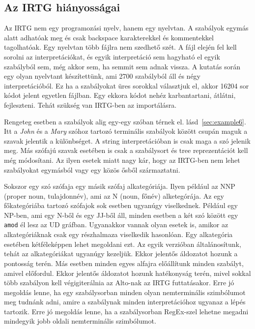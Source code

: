 \subsection{Az IRTG hiányosságai}
\label{sec:IRTGshortcomming}

Az IRTG nem egy programozási nyelv, hanem egy nyelvtan. A szabályok egymás alatt adhatóak meg és csak backspace karakterekkel és kommentekkel tagolhatóak. Egy nyelvtan több fájlra nem szedhető szét. A fájl elején fel kell sorolni az interpretációkat, és egyik interpretáció sem hagyható el egyik szabályból sem, még akkor sem, ha semmit sem adnak vissza. A kutatás során egy olyan nyelvtant készítettünk, ami 2700 szabályból áll és négy interpretációból. Ez ha a szabályokat üres sorokkal választjuk el, akkor 16204 sor kódot jelent egyetlen fájlban. Egy ekkora kódot nehéz karbantartani, átlátni, fejleszteni. Tehát szükség van IRTG-ben az importálásra.


Rengeteg esetben a szabályok alig egy-egy szóban térnek el. lásd~\ref{sec:example6}.
Itt a \textit{John} és a \textit{Mary} szóhoz tartozó terminális szabályok között csupán maguk a szavak jelentik a különbséget. A string interpretációban is csak maga a szó jelenik meg. Más szófajú szavak esetében is csak a szabálysort és tree reprezentációt kell még módosítani. Az ilyen esetek miatt nagy kár, hogy az IRTG-ben nem lehet szabályokat egymásból vagy egy közös ősből származtatni.


Sokszor egy szó szófaja egy másik szófaj alkategóriája. Ilyen például az NNP (proper noun, tulajdonnév), ami az N (noun, főnév) alketegórája. Az egy főkategóriába tartozó szófajok sok esetben ugyanúgy viselkednek. Például egy NP-ben, ami egy N-ből és egy JJ-ből áll, minden esetben a két szó között egy \texttt{amod} él lesz az UD gráfban. Ugyanakkor vannak olyan esetek is, amikor az alkategóriáknak csak egy részhalmaza viselkedik hasonlóan. Egy alkategória esetében kétféleképpen lehet megoldani ezt. Az egyik verzióban általánosítunk, tehát az alkategóriákat ugyanúgy kezeljük. Ekkor jelentős áldozatot hozunk a pontosság terén. Más esetben minden egyes alfajra előállítunk minden szabályt, amivel előfordul. Ekkor jelentős áldozatot hozunk hatékonyság terén, mivel sokkal több szabályon kell végigiterálnia az Alto-nak az IRTG futtatásakor. Erre jó megoldás lenne, ha egy szabálysorban minden olyan nemterminális szimbólumot meg tudnánk adni, amire a szabálynak minden interpretációhoz ugyanaz a lépés tartozik. Erre jó megoldás lenne, ha a szabálysorban RegEx-szel lehetne megadni mindegyik jobb oldali nemterminális szimbólumot.



